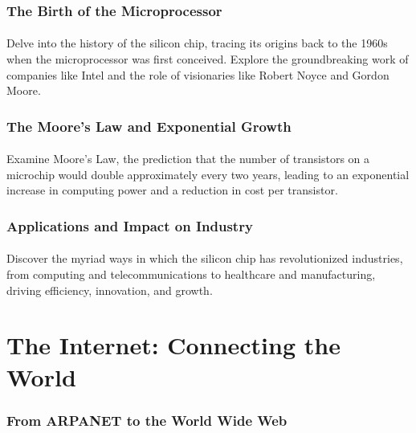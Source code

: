 \documentclass[a4paper,12pt]{book}
\begin{document}
\paragraph{}
\subsubsection*{The Birth of the Microprocessor}
\paragraph{}
Delve into the history of the silicon chip, tracing its origins back to the 1960s when the microprocessor was first conceived. Explore the groundbreaking work of companies like Intel and the role of visionaries like Robert Noyce and Gordon Moore.

\subsubsection*{The Moore's Law and Exponential Growth}
\paragraph{}
Examine Moore’s Law, the prediction that the number of transistors on a microchip would double approximately every two years, leading to an exponential increase in computing power and a reduction in cost per transistor.

\subsubsection*{Applications and Impact on Industry}
\paragraph{}
Discover the myriad ways in which the silicon chip has revolutionized industries, from computing and telecommunications to healthcare and manufacturing, driving efficiency, innovation, and growth.

\section*{The Internet: Connecting the World}
\paragraph{}
\subsubsection*{From ARPANET to the World Wide Web}
\end{document}
